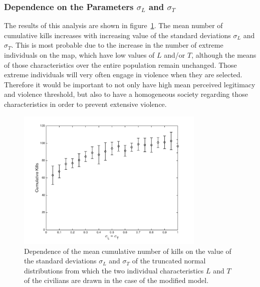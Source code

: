 \documentclass[11pt]{article}
\begin{document}
\subsubsection{Dependence on the Parameters $\sigma_L$ and $\sigma_T$}
The results of this analysis are shown in figure~\ref{fig:L_T_std_dep}. The mean number of cumulative kills increases with increasing value of the standard deviations $\sigma_L$ and $\sigma_T$. This is most probable due to the increase in the number of extreme individuals on the map, which have low values of $L$ and/or $T$, although the means of those characteristics over the entire population remain unchanged. Those extreme individuals will very often engage in violence when they are selected. Therefore it would be important to not only have high mean perceived legitimacy and violence threshold, but also to have a homogeneous society regarding those characteristics in order to prevent extensive violence.
\begin{figure}[!htbp]
	\centering
		\includegraphics[width=0.80\textwidth]{../../code/modified_model/L_T_std_dep.png}
	\caption{Dependence of the mean cumulative number of kills on the value of the standard deviations $\sigma_L$ and $\sigma_T$ of the truncated normal distributions from which the two individual characteristics $L$ and $T$ of the civilians are drawn in the case of the modified model.}
	\label{fig:L_T_std_dep}
\end{figure}
\end{document}
